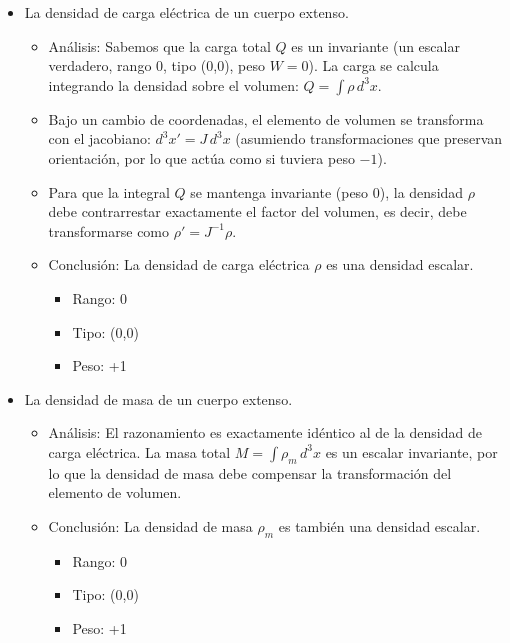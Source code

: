 \documentclass[11pt,spanish]{article}
\begin{document}
\begin{itemize}
\item La densidad de carga eléctrica de un cuerpo extenso.
\begin{itemize}
\item Análisis: Sabemos que la carga total $Q$ es un invariante (un escalar verdadero, rango 0, tipo (0,0), peso $W=0$). La carga se calcula integrando la densidad sobre el volumen: $Q = \int \rho \, d^3x$.
\item Bajo un cambio de coordenadas, el elemento de volumen se transforma con el jacobiano: $d^3x' = J \, d^3x$ (asumiendo transformaciones que preservan orientación, por lo que actúa como si tuviera peso $-1$). 
\item Para que la integral $Q$ se mantenga invariante (peso 0), la densidad $\rho$ debe contrarrestar exactamente el factor del volumen, es decir, debe transformarse como $\rho' = J^{-1} \rho$.
\item Conclusión: La densidad de carga eléctrica $\rho$ es una densidad escalar.
\begin{itemize}
\item Rango: 0
\item Tipo: (0,0)
\item Peso: +1
\end{itemize}
\end{itemize}

\item La densidad de masa de un cuerpo extenso.
\begin{itemize}
\item Análisis: El razonamiento es exactamente idéntico al de la densidad de carga eléctrica. La masa total $M = \int \rho_m \, d^3x$ es un escalar invariante, por lo que la densidad de masa debe compensar la transformación del elemento de volumen.
\item Conclusión: La densidad de masa $\rho_m$ es también una densidad escalar.
\begin{itemize}
\item Rango: 0
\item Tipo: (0,0)
\item Peso: +1
\end{itemize}
\end{itemize}


\end{itemize}
\end{document}

